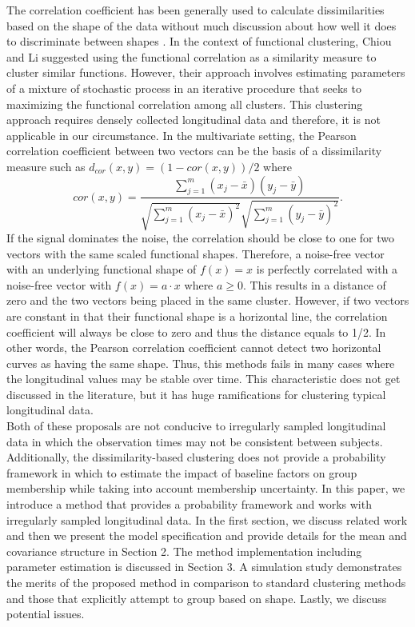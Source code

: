 \documentclass[12pt]{article}
\begin{document}
The correlation coefficient has been generally used to calculate dissimilarities based on the shape of the data without much discussion about how well it does to discriminate between shapes \cite{chouakria2007,  eisen1998, chiou2008}. In the context of functional clustering, Chiou and Li \cite{chiou2008} suggested using the functional correlation as a similarity measure to cluster similar functions. However, their approach involves estimating parameters of a mixture of stochastic process in an iterative procedure that seeks to maximizing the functional correlation among all clusters. This clustering approach requires densely collected longitudinal data and therefore, it is not applicable in our circumstance. In the multivariate setting, the Pearson correlation coefficient between two vectors can be the basis of a dissimilarity measure such as $d_{cor}(x,y) = (1-cor(x,y))/2$ where $$cor(x,y) = \frac{\sum^{m}_{j=1}(x_{j}-\bar{x})(y_{j}-\bar{y})}{\sqrt{\sum^{m}_{j=1}(x_{j}-\bar{x})^{2}}\sqrt{\sum^{m}_{j=1}(y_{j}-\bar{y})^{2}}}.$$
If the signal dominates the noise, the correlation should be close to one for two vectors with the same scaled functional shapes. Therefore, a noise-free vector with an underlying functional shape of $f(x)=x$ is perfectly correlated with a noise-free vector with $f(x)=a\cdot x$ where $a\geq0$. This results in a distance of zero and the two vectors being placed in the same cluster. However, if two vectors are constant in that their functional shape is a horizontal line, the correlation coefficient will always be close to zero and thus the distance equals to 1/2. In other words, the Pearson correlation coefficient cannot detect two horizontal curves as having the same shape. Thus, this methods fails in many cases where the longitudinal values may be stable over time. This characteristic does not get discussed in the literature, but it has huge ramifications for clustering typical longitudinal data.\\

Both of these proposals are not conducive to irregularly sampled longitudinal data in which the observation times may not be consistent between subjects. Additionally, the dissimilarity-based clustering does not provide a probability framework in which to estimate the impact of baseline factors on group membership while taking into account membership uncertainty.  In this paper, we introduce a method that provides a probability framework and works with irregularly sampled longitudinal data. In the first section, we discuss related work and then we present the model specification and provide details for the mean and covariance structure in Section 2. The method implementation including parameter estimation is discussed in Section 3. A simulation study demonstrates the merits of the proposed method in comparison to standard clustering methods and those that explicitly attempt to group based on shape. Lastly, we discuss potential issues.
\end{document}
